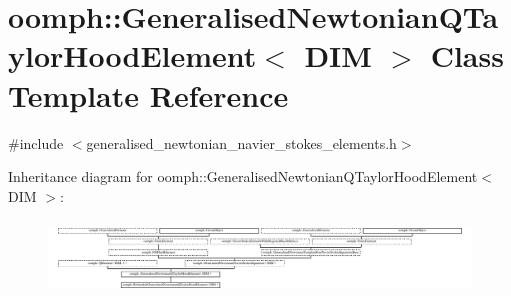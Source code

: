 \hypertarget{classoomph_1_1GeneralisedNewtonianQTaylorHoodElement}{}\section{oomph\+:\+:Generalised\+Newtonian\+Q\+Taylor\+Hood\+Element$<$ D\+IM $>$ Class Template Reference}
\label{classoomph_1_1GeneralisedNewtonianQTaylorHoodElement}


{\ttfamily \#include $<$generalised\+\_\+newtonian\+\_\+navier\+\_\+stokes\+\_\+elements.\+h$>$}

Inheritance diagram for oomph\+:\+:Generalised\+Newtonian\+Q\+Taylor\+Hood\+Element$<$ D\+IM $>$\+:\begin{figure}[H]
\begin{center}
\leavevmode
\includegraphics[height=1.981132cm]{classoomph_1_1GeneralisedNewtonianQTaylorHoodElement}
\end{center}
\end{figure}
